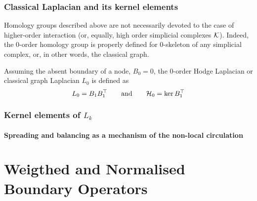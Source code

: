 
\subsubsection{ Classical Laplacian and its kernel elements }

Homology groups described above are not necessarily devoted to the case of higher-order interaction (or, equally, high order simplicial complexes \( \mathcal{K} \)). Indeed, the \( 0 \)-order homology group is properly defined for \( 0\)-skeleton of any simplicial complex, or, in other words, the classical graph.

Assuming the absent boundary of a node, \( B_0 = 0 \), the \( 0 \)-order Hodge Laplacian or classical graph Laplacian \( L_0 \) is defined as
\begin{equation}
      L_0 = B_1 B_1^\top \qquad \text{and} \qquad \mathcal{H}_0 = \ker B_1^\top
\end{equation}



 \subsubsection{ Kernel elements of \( L_k \) }


\paragraph{ Spreading and balancing as a mechanism of the non-local circulation}
















\section{ Weigthed and Normalised Boundary Operators}







